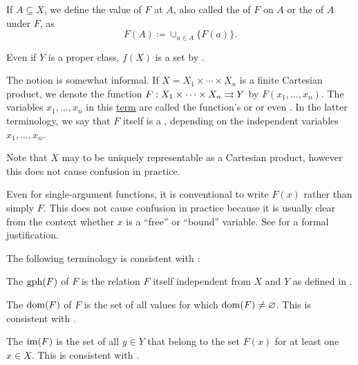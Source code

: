 \begin{definition}
\begin{DefEnum}[series=def:function]
     If \( A \subseteq X \), we define the value of \( F \) at \( A \), also called the  of \( F \) on \( A \) or the  of \( A \) under \( F \), as
    \begin{equation*}
      F(A) \coloneqq \cup_{a \in A} \{ F(a) \}.
    \end{equation*}

    Even if \( Y \) is a proper class, \( f(X) \) is a set by .

     The notion  is somewhat informal. If \( X = X_1 \times \cdots \times X_n \) is a finite Cartesian product, we denote the function \( F: X_1 \times \cdots \times X_n \rightrightarrows Y \) by \( F(x_1, \ldots, x_n) \). The variables \( x_1, \ldots, x_n \) in this \hyperref[def:first_order_term]{term} are called the function's  or  or even . In the latter terminology, we say that \( F \) itself is a , depending on the independent variables \( x_1, \ldots, x_n \).

    Note that \( X \) may to be uniquely representable as a Cartesian product, however this does not cause confusion in practice.

    Even for single-argument functions, it is conventional to write \( F(x) \) rather than simply \( F \). This does not cause confusion in practice because it is usually clear from the context whether \( x \) is a \enquote{free} or \enquote{bound} variable. See  for a formal justification.
  \end{DefEnum}

  The following terminology is consistent with :
  \begin{DefEnum}[resume=def:function]
     The  \( \operatorname{gph}(F) \) of \( F \) is the relation \( F \) itself independent from \( X \) and \( Y \) as defined in .

     The  \( \operatorname{dom}(F) \) of \( F \) is the set of all values for which \( \operatorname{dom}(F) \neq \varnothing \). This is consistent with .

     The  \( \operatorname{im}(F) \) is the set of all \( y \in Y \) that belong to the set \( F(x) \) for at least one \( x \in X \). This is consistent with .


\end{DefEnum}
\end{definition}
